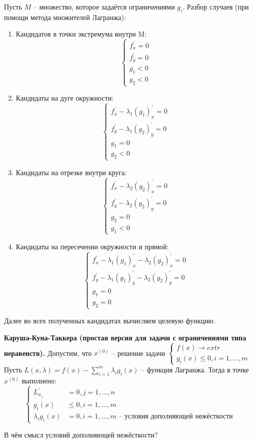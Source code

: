 Пусть $M$ -- множество, которое задаётся ограничениями $g_i$. Разбор случаев (при помощи метода множителей Лагранжа):
\begin{enumerate}
    \item Кандидатов в точки экстремума внутри M:
        \[\left\{\begin{aligned}
            f^{'}_x = 0 \\
            f^{'}_y = 0 \\
            g_1 < 0 \\
            g_2 < 0
        \end{aligned}\right.\]
    \item Кандидаты на дуге окружности:
        \[\left\{\begin{aligned}
            f^{'}_x - \lambda_1 (g_1)^{'}_x = 0 \\
            f^{'}_y - \lambda_1 (g_2)^{'}_y = 0 \\
            g_1 = 0 \\
            g_2 < 0
        \end{aligned}\right.\]
    \item Кандидаты на отрезке внутри круга:
        \[\left\{\begin{aligned}
            f^{'}_x - \lambda_2 (g_2)^{'}_x = 0 \\
            f^{'}_y - \lambda_2 (g_2)^{'}_y = 0 \\
            g_2 = 0 \\
            g_1 < 0
        \end{aligned}\right.\]
    \item Кандидаты на пересечении окружности и прямой:
        \[\left\{\begin{aligned}
            f^{'}_x - \lambda_1 (g_1)^{'}_x - \lambda_2 (g_2)^{'}_x = 0 \\
            f^{'}_y - \lambda_1 (g_1)^{'}_y - \lambda_2 (g_2)^{'}_y = 0 \\
            g_1 = 0 \\
            g_2 = 0
        \end{aligned}\right.\]
\end{enumerate}
Далее во всех полученных кандидатах вычисляем целевую функцию.

\begin{theorem}{\textbf{Каруша-Куна-Таккера (простая версия для задачи с ограничениями типа неравенств).}}
Допустим, что $x^{(0)}$ -- решение задачи
$\begin{cases}
    f(x) \to extr \\
    g_i(x) \leqslant 0, i = 1, ..., m
\end{cases}$\\
Пусть $L(x, \lambda) = f(x) - \sum\limits_{i = 1}^{m} \lambda_i g_i(x)$ -- функция Лагранжа. Тогда в точке $x^{(0)}$ выполнено:
\[\left\{\begin{aligned}
    L^{'}_{x_j} &= 0, j = 1, ..., n\\
    g_i(x) &\leqslant 0, i = 1, ..., m\\
    \lambda_i g_i(x) &= 0, i = 1, ..., m \text{ -- условия дополняющей нежёсткости}
\end{aligned}\right.\]
\end{theorem}

\begin{remark}
В чём смысл условий дополняющей нежёсткости?
\end{remark}